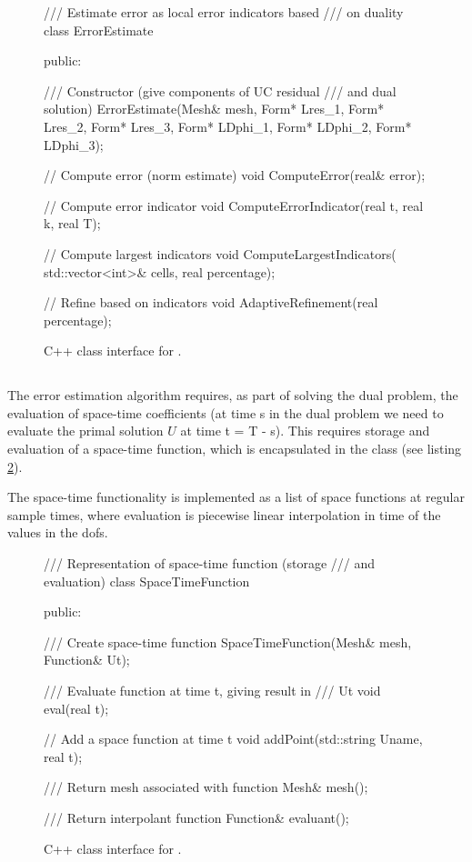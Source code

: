 \begin{figure}
\begin{c++}
/// Estimate error as local error indicators based
/// on duality
class ErrorEstimate
{
public:

  /// Constructor (give components of UC residual
  /// and dual solution)
  ErrorEstimate(Mesh& mesh,
		Form* Lres_1,
		Form* Lres_2,
		Form* Lres_3,
		Form* LDphi_1,
		Form* LDphi_2,
		Form* LDphi_3);

  // Compute error (norm estimate)
  void ComputeError(real& error);

  // Compute error indicator
  void ComputeErrorIndicator(real t, real k,
                             real T);

  // Compute largest indicators
  void ComputeLargestIndicators(
    std::vector<int>& cells,
    real percentage);

  // Refine based on indicators
  void AdaptiveRefinement(real percentage);
}
\end{c++}
\caption{C++ class interface for .}
\label{code:ErrorEstimate}
\end{figure}

\subsection{}

The error estimation algorithm requires, as part of solving the dual
problem, the evaluation of space-time coefficients (at time s in the
dual problem we need to evaluate the primal solution $U$ at time t =
T - s). This requires storage and evaluation of a space-time function,
which is encapsulated in the  class (see listing
\ref{code:SpaceTimeFunction}).

The space-time functionality is implemented as a list of space
functions at regular sample times, where evaluation is piecewise linear
interpolation in time of the values in the dofs.

\begin{figure}
\begin{c++}
/// Representation of space-time function (storage
/// and evaluation)
class SpaceTimeFunction
{
public:

  /// Create space-time function
  SpaceTimeFunction(Mesh& mesh, Function& Ut);

  /// Evaluate function at time t, giving result in
  /// Ut
  void eval(real t);

  // Add a space function at time t
  void addPoint(std::string Uname, real t);

  /// Return mesh associated with function
  Mesh& mesh();

  /// Return interpolant function
  Function& evaluant();
}
\end{c++}
\caption{C++ class interface for .}
\label{code:SpaceTimeFunction}
\end{figure}



